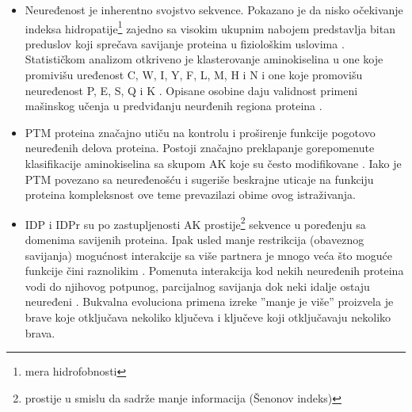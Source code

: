 \begin{itemize}

  \item
    Neuređenost je inherentno svojstvo sekvence\parencite{dunker2001}.
    Pokazano je da nisko očekivanje indeksa hidropatije\footnote{mera hidrofobnosti} zajedno sa visokim
    ukupnim nabojem predstavlja bitan preduslov koji sprečava savijanje
    proteina u fiziološkim uslovima \parencite{uversky2016}. Statističkom
    analizom otkriveno je klasterovanje aminokiselina u one koje promivišu
    uređenost C, W, I, Y, F, L, M, H i N  i one koje
    promovišu neuređenost P, E, S, Q i K .
    \parencite{oldfield2014, uversky2016} Opisane osobine daju validnost
    primeni mašinskog učenja u predviđanju neurđenih regiona proteina
    \parencite{oldfield2014}.

  \item
    PTM proteina značajno utiču na  kontrolu i proširenje funkcije pogotovo
    neuređenih delova proteina. Postoji značajno preklapanje gorepomenute
    klasifikacije aminokiselina sa skupom AK koje su često modifikovane
    \parencite{uversky2016}. Iako je PTM povezano sa neuređenošću i sugeriše
    beskrajne uticaje na funkciju proteina\parencite{uversky2016} kompleksnost
    ove teme prevazilazi obime ovog istraživanja.

  \item
    IDP i IDPr su po zastupljenosti AK prostije\footnote{ prostije u smislu da
    sadrže manje informacija (Šenonov indeks)} sekvence u poređenju sa domenima
    savijenih proteina. Ipak usled manje restrikcija (obaveznog savijanja)
    mogućnost interakcije sa više partnera je mnogo veća što moguće funkcije
    čini raznolikim \parencite{uversky2016}.  Pomenuta interakcija kod nekih
    neuređenih proteina vodi do njihovog potpunog, parcijalnog savijanja dok
    neki idalje ostaju neuređeni \parencite{uversky2016}.  Bukvalna evoluciona
    primena izreke ''manje je više'' proizvela je brave koje otključava
    nekoliko ključeva i ključeve koji otključavaju nekoliko brava.


\end{itemize}
